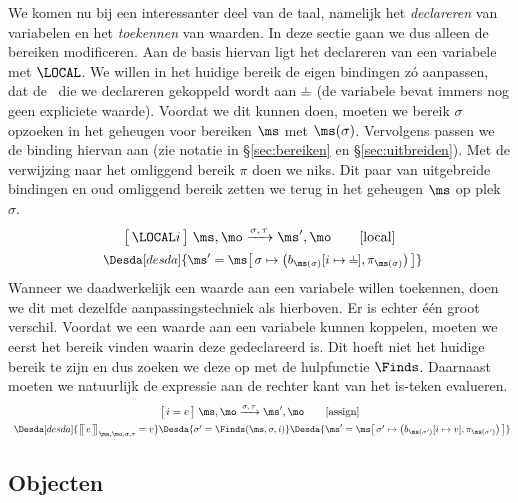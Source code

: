 We komen nu bij een interessanter deel van de taal, namelijk het \emph{declareren} van variabelen en het \emph{toekennen} van waarden. In deze sectie gaan we dus alleen de bereiken modificeren. Aan de basis hiervan ligt het declareren van een variabele met $\LOCAL$. We willen in het huidige bereik de eigen bindingen zó aanpassen, dat de \Id\ die we declareren gekoppeld wordt aan $\nil$ (de variabele bevat immers nog geen expliciete waarde). Voordat we dit kunnen doen, moeten we bereik $\sigma$ opzoeken in het geheugen voor bereiken $\ms$ met $\ms(\sigma)$. Vervolgens passen we de binding hiervan aan (zie notatie in §\ref{sec:bereiken} en §\ref{sec:uitbreiden}). Met de verwijzing naar het omliggend bereik $\pi$ doen we niks. Dit paar van uitgebreide bindingen en oud omliggend bereik zetten we terug in het geheugen $\ms$ op plek $\sigma$.
%
\begin{gather*}
  \Terminates{\LOCAL i}
    {\ms, \mo}
    {\sigma, \tau}
    {\ms', \mo}
  \tag*{[local]} \\
  \Desdas{
    \Desda[desda]{\ms' = \ms \surr{ \sigma \mapsto \big(b_{\ms(\sigma)}[i \mapsto \BOT], \pi_{\ms(\sigma)}\big) }}
  }
\end{gather*}
%
Wanneer we daadwerkelijk een waarde aan een variabele willen toekennen, doen we dit met dezelfde aanpassingstechniek als hierboven. Er is echter één groot verschil. Voordat we een waarde aan een variabele kunnen koppelen, moeten we eerst het bereik vinden waarin deze gedeclareerd is. Dit hoeft niet het huidige bereik te zijn en dus zoeken we deze op met de hulpfunctie $\Finds$. Daarnaast moeten we natuurlijk de expressie aan de rechter kant van het is-teken evalueren.
%
\begin{gather*}
  \Terminates{i = e}
    {\ms, \mo}
    {\sigma, \tau}
    {\ms', \mo}
  \tag*{[assign]} \\
  \Desdas{
    \Desda[desda]{\Express{e}{\ms, \mo, \sigma, \tau} = v}
    \Desda{\sigma' = \Finds(\ms, \sigma, i)}
    \Desda{\ms'= \ms \surr{ \sigma' \mapsto \big(b_{\ms(\sigma')}[ i \mapsto v ], \pi_{\ms(\sigma')}\big) }}
  }
\end{gather*}

\subsection{Objecten}

